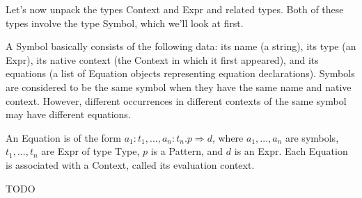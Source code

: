 \documentclass{article}
\begin{document}
Let's now unpack the types Context and Expr and related types. Both of these types involve the type Symbol, which we'll look at first.

A Symbol basically consists of the following data: its name (a string), its type (an Expr), its native context (the Context in which it first appeared), and its equations (a list of Equation objects representing equation declarations). Symbols are considered to be the same symbol when they have the same name and native context. However, different occurrences in different contexts of the same symbol may have different equations.

An Equation is of the form $a_1 : t_1, ..., a_n : t_n. p \Rightarrow d$, where $a_1,...,a_n$ are symbols, $t_1,...,t_n$ are Expr of type Type, $p$ is a Pattern, and $d$ is an Expr. Each Equation is associated with a Context, called its evaluation context.

TODO
\end{document}
